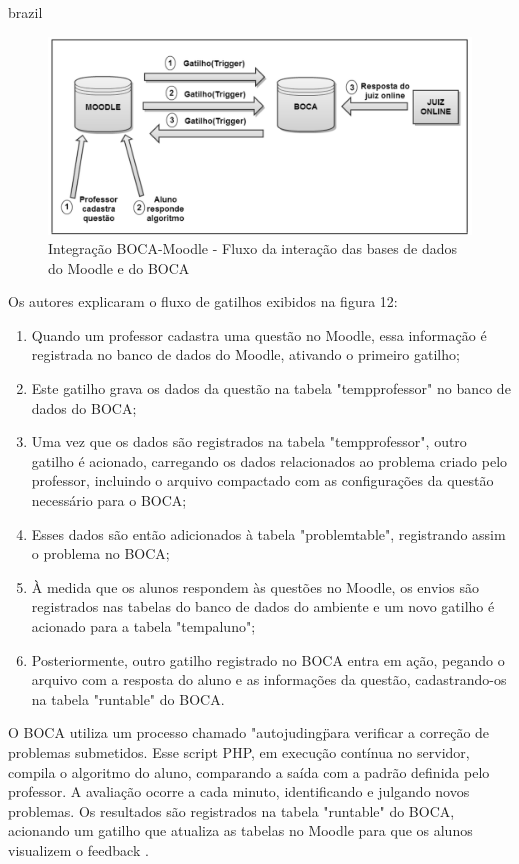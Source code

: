\begin{otherlanguage*}{brazil}
\begin{figure}[h!]
	   \centering
            \caption{Integração BOCA-Moodle - Fluxo da interação das bases de dados do Moodle e do BOCA}
            \label{fig:ModeloConceitual}
	   	\includegraphics[scale=0.3]{pictures/BOCA_fluxo.png}
\end{figure}

Os autores explicaram o fluxo de gatilhos exibidos na figura 12:


\begin{enumerate} [label=(\alph*)]
    \item Quando um professor cadastra uma questão no Moodle, essa informação é registrada no banco de dados do Moodle, ativando o primeiro gatilho;
    \item Este gatilho grava os dados da questão na tabela "tempprofessor" no banco de dados do BOCA;
    \item Uma vez que os dados são registrados na tabela "tempprofessor", outro gatilho é acionado, carregando os dados relacionados ao problema criado pelo professor, incluindo o arquivo compactado com as configurações da questão necessário para o BOCA;
    \item Esses dados são então adicionados à tabela "problemtable", registrando assim o problema no BOCA;
    \item À medida que os alunos respondem às questões no Moodle, os envios são registrados nas tabelas do banco de dados do ambiente e um novo gatilho é acionado para a tabela "tempaluno";
    \item Posteriormente, outro gatilho registrado no BOCA entra em ação, pegando o arquivo com a resposta do aluno e as informações da questão, cadastrando-os na tabela "runtable" do BOCA.
\end{enumerate}

O BOCA utiliza um processo chamado "autojuding\" para verificar a correção de problemas submetidos. Esse script PHP, em execução contínua no servidor, compila o algoritmo do aluno, comparando a saída com a padrão definida pelo professor. A avaliação ocorre a cada minuto, identificando e julgando novos problemas. Os resultados são registrados na tabela "runtable" do BOCA, acionando um gatilho que atualiza as tabelas no Moodle para que os alunos visualizem o feedback  \cite[p.~29]{galasso}.


\end{otherlanguage*}
